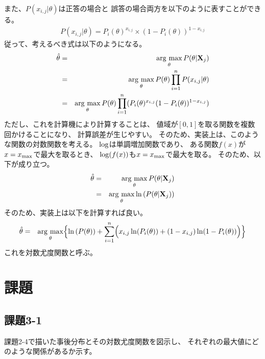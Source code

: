 \documentclass[12pt]{jarticle}
\begin{document}
また、$P(x_{i,j}|\theta)$は正答の場合と
誤答の場合両方を以下のように表すことができる。
\begin{eqnarray}
    P(x_{i,j}|\theta)=P_i(\theta)^{x_{i,j}}\times (1-P_i(\theta))^{1-x_{i,j}}
\end{eqnarray}
従って、考えるべき式は以下のようになる。
\begin{eqnarray}
    \hat{\theta}&=& \mathop{\rm arg~max}\limits_{\theta} P(\theta|{\bf X}_j) \nonumber\\
    &=& \mathop{\rm arg~max}\limits_{\theta} P(\theta)\prod_{i=1}^n P(x_{i,j}|\theta) \nonumber\\
    &=& \mathop{\rm arg~max}\limits_{\theta} P(\theta)\prod_{i=1}^n (P_i(\theta)^{x_{i,j}}(1-P_i(\theta))^{1-x_{i,j}})
\end{eqnarray}
ただし、これを計算機により計算することは、
値域が$[0,1]$を取る関数を複数回かけることになり、
計算誤差が生じやすい。
そのため、実装上は、このような関数の対数関数を考える。
${\rm log}$は単調増加関数であり、
ある関数$f(x)$が$x=x_{\rm max}$で最大を取るとき、
${\rm log}(f(x))$も$x=x_{\rm max}$で最大を取る。
そのため、以下が成り立つ。
\begin{eqnarray}
    \hat{\theta}&=& \mathop{\rm arg~max}\limits_{\theta} P(\theta|{\bf X}_j)\\
    &=& \mathop{\rm arg~max}\limits_{\theta} \ln{(P(\theta|{\bf X}_j))}
\end{eqnarray}
そのため、実装上は以下を計算すれば良い。
\begin{eqnarray}
    \hat{\theta}&=& \mathop{\rm arg~max}\limits_{\theta} \Bigl\{\ln{(P(\theta))
    +\sum_{i=1}^n \Bigl(x_{i,j}\ln(P_i(\theta))+(1-x_{i,j})\ln(1-P_i(\theta))\Bigr)}\Bigr\}
\end{eqnarray}
これを対数尤度関数と呼ぶ。

\section{課題}
\subsection{課題3-1}
\begin{shadebox}
    課題2-4で描いた事後分布とその対数尤度関数を図示し、
    それぞれの最大値にどのような関係があるか示す。
\end{shadebox}
\end{document}
